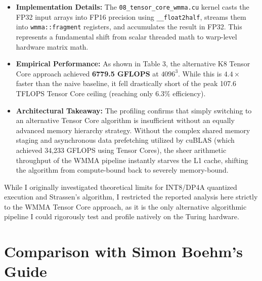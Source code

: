\documentclass[11pt]{article}
\begin{document}
\begin{itemize}
    \item \textbf{Implementation Details:} The \texttt{08\_tensor\_core\_wmma.cu} kernel casts the FP32 input arrays into FP16 precision using \texttt{\_\_float2half}, streams them into \texttt{wmma::fragment} registers, and accumulates the result in FP32. This represents a fundamental shift from scalar threaded math to warp-level hardware matrix math.
    \item \textbf{Empirical Performance:} As shown in Table 3, the alternative K8 Tensor Core approach achieved \textbf{6779.5 GFLOPS} at $4096^3$. While this is $4.4\times$ faster than the naive baseline, it fell drastically short of the peak 107.6 TFLOPS Tensor Core ceiling (reaching only 6.3\% efficiency). 
    \item \textbf{Architectural Takeaway:} The profiling confirms that simply switching to an alternative Tensor Core algorithm is insufficient without an equally advanced memory hierarchy strategy. Without the complex shared memory staging and asynchronous data prefetching utilized by cuBLAS (which achieved 34,233 GFLOPS using Tensor Cores), the sheer arithmetic throughput of the WMMA pipeline instantly starves the L1 cache, shifting the algorithm from compute-bound back to severely memory-bound.
\end{itemize}

While I originally investigated theoretical limits for INT8/DP4A quantized execution and Strassen's algorithm, I restricted the reported analysis here strictly to the WMMA Tensor Core approach, as it is the only alternative algorithmic pipeline I could rigorously test and profile natively on the Turing hardware.

\section{Comparison with Simon Boehm's Guide}
\end{document}
